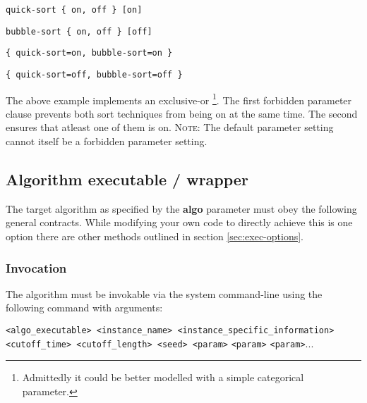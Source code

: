 \documentclass[manual.tex]{subfiles}
\begin{document}
\texttt{quick-sort~\{~on,~off~\}~{[}on{]}}

\texttt{bubble-sort~\{~on,~off~\}~{[}off{]}}

\texttt{\{~quick-sort=on,~bubble-sort=on~\}}

\texttt{\{~quick-sort=off,~bubble-sort=off~\}}

The above example implements an exclusive-or \footnote{Admittedly it could be
better modelled with a simple categorical parameter.}. The first forbidden parameter clause prevents both sort techniques from being on at the same time. The second ensures that atleast one of them is on. \textsc{Note:} The default parameter setting cannot itself be a forbidden parameter setting.


\subsection{Algorithm executable / wrapper}

\label{sec:exec-spec} The target algorithm as specified by the \textbf{algo} parameter must obey the following general contracts. While modifying your own code to directly achieve this is one option there are other methods outlined in section \ref{sec:exec-options}.

\subsubsection{Invocation}

The algorithm must be invokable via the system command-line using the following command with arguments:

\texttt{<algo\_executable> <instance\_name> <instance\_specific\_information>
<cutoff\_time> <cutoff\_length> <seed> <param>} \texttt{<param>} \texttt{<param>}...
\end{document}
